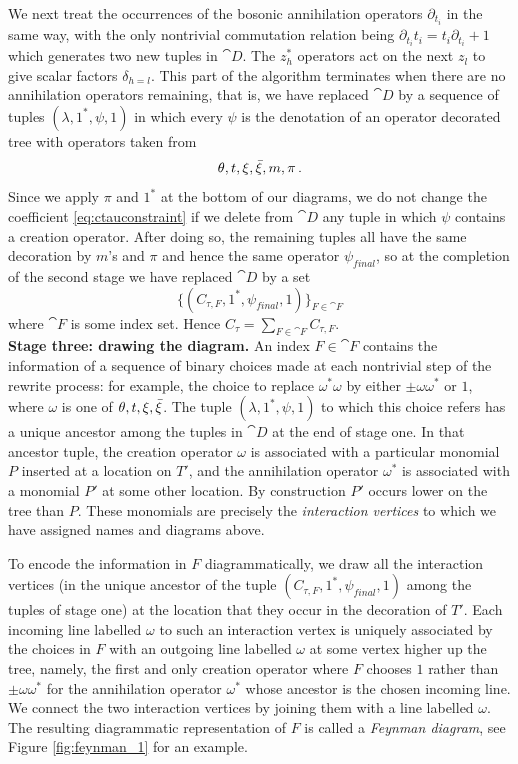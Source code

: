 \documentclass[english,letter paper,12pt,leqno]{article}
\theoremstyle{example}
\numberwithin{equation}{section}
\begin{document}
We next treat the occurrences of the bosonic annihilation operators $\partial_{t_i}$ in the same way, with the only nontrivial commutation relation being $\partial_{t_i} t_i = t_i \partial_{t_i} + 1$ which generates two new tuples in $\cat{D}$. The $z_h^*$ operators act on the next $z_l$ to give scalar factors $\delta_{h=l}$. This part of the algorithm terminates when there are no annihilation operators remaining, that is, we have replaced $\cat{D}$ by a sequence of tuples $(\lambda, 1^*, \psi, 1)$ in which every $\psi$ is the denotation of an operator decorated tree with operators taken from
\[
\theta, t, \xi, \Bar{\xi}, m, \pi\,.
\]
Since we apply $\pi$ and $1^*$ at the bottom of our diagrams, we do not change the coefficient \eqref{eq:ctauconstraint} if we delete from $\cat{D}$ any tuple in which $\psi$ contains a creation operator. After doing so, the remaining tuples all have the same decoration by $m$'s and $\pi$ and hence the same operator $\psi_{final}$, so at the completion of the second stage we have replaced $\cat{D}$ by a set
\[
\Big\{ (C_{\tau, F}, 1^*, \psi_{final}, 1) \Big\}_{F \in \cat{F}}
\]
where $\cat{F}$ is some index set. Hence $C_\tau = \sum_{F \in \cat{F}} C_{\tau, F}$.
\\

\textbf{Stage three: drawing the diagram.} An index $F \in \cat{F}$ contains the information of a sequence of binary choices made at each nontrivial step of the rewrite process: for example, the choice to replace $\omega^* \omega$ by either $\pm \omega \omega^*$ or $1$, where $\omega$ is one of $\theta, t, \xi, \Bar{\xi}$. The tuple $(\lambda, 1^*, \psi, 1)$ to which this choice refers has a unique ancestor among the tuples in $\cat{D}$ at the end of stage one. In that ancestor tuple, the creation operator $\omega$ is associated with a particular monomial $P$ inserted at a location on $T'$, and the annihilation operator $\omega^*$ is associated with a monomial $P'$ at some other location. By construction $P'$ occurs lower on the tree than $P$. These monomials are precisely the \emph{interaction vertices} to which we have assigned names and diagrams above.

To encode the information in $F$ diagrammatically, we draw all the interaction vertices (in the unique ancestor of the tuple $(C_{\tau, F}, 1^*, \psi_{final}, 1)$ among the tuples of stage one) at the location that they occur in the decoration of $T'$. Each incoming line labelled $\omega$ to such an interaction vertex is uniquely associated by the choices in $F$ with an outgoing line labelled $\omega$ at some vertex higher up the tree, namely, the first and only creation operator where $F$ chooses $1$ rather than $\pm \omega \omega^*$ for the annihilation operator $\omega^*$ whose ancestor is the chosen incoming line. We connect the two interaction vertices by joining them with a line labelled $\omega$. The resulting diagrammatic representation of $F$ is called a \emph{Feynman diagram}, see Figure \ref{fig:feynman_1} for an example.
\\
\end{document}
